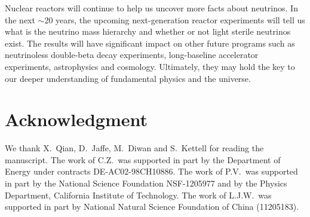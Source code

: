 \documentclass[aps,twocolumn,preprintnumbers,amsmath,superscriptaddress,amssymb,floats,nofootinbib]{revtex4-1}
\begin{document}
Nuclear reactors will continue to help us uncover more facts about neutrinos. In the next $\sim$20 years, the upcoming next-generation reactor experiments will tell us what is the neutrino mass hierarchy and whether or not light sterile neutrinos exist. The results will have significant impact on other future programs such as neutrinoless double-beta decay experiments, long-baseline accelerator experiments, astrophysics and cosmology. Ultimately, they may hold the key to our deeper understanding of fundamental physics and the universe.

\vspace{12pt}
\section*{Acknowledgment}
We thank X.~Qian, D.~Jaffe, M.~Diwan and S.~Kettell for reading the manuscript.
The work of C.Z.~was supported in part by the Department of Energy under contracts DE-AC02-98CH10886.
The work of P.V.~was supported in part by the National Science Foundation NSF-1205977 and by the Physics Department, California Institute of Technology.
The work of L.J.W.~was supported in part by National Natural Science Foundation of China (11205183).







\end{document}
